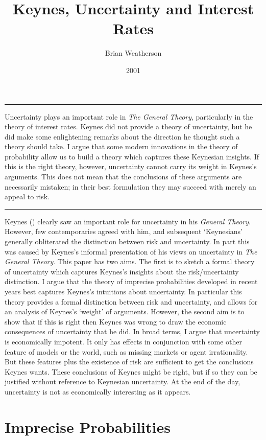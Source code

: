 \documentclass[
  10pt,
  letterpaper,
  DIV=11,
  numbers=noendperiod,
  twoside]{scrartcl}
\title{Keynes, Uncertainty and Interest Rates}
\author{Brian Weatherson}
\date{2001}
\renewenvironment{abstract}
 {\vspace{-1.25cm}
 \quotation\small\noindent\rule{\linewidth}{.5pt}\par\smallskip
 \noindent }
 {\par\noindent\rule{\linewidth}{.5pt}\endquotation}
\begin{document}
\maketitle
\begin{abstract}
Uncertainty plays an important role in \emph{The General Theory},
particularly in the theory of interest rates. Keynes did not provide a
theory of uncertainty, but he did make some enlightening remarks about
the direction he thought such a theory should take. I argue that some
modern innovations in the theory of probability allow us to build a
theory which captures these Keynesian insights. If this is the right
theory, however, uncertainty cannot carry its weight in Keynes's
arguments. This does not mean that the conclusions of these arguments
are necessarily mistaken; in their best formulation they may succeed
with merely an appeal to risk.
\end{abstract}


Keynes () clearly saw an important role
for uncertainty in his \emph{General Theory}. However, few
contemporaries agreed with him, and subsequent `Keynesians' generally
obliterated the distinction between risk and uncertainty. In part this
was caused by Keynes's informal presentation of his views on uncertainty
in \emph{The General Theory}. This paper has two aims. The first is to
sketch a formal theory of uncertainty which captures Keynes's insights
about the risk/uncertainty distinction. I argue that the theory of
imprecise probabilities developed in recent years best captures Keynes's
intuitions about uncertainty. In particular this theory provides a
formal distinction between risk and uncertainty, and allows for an
analysis of Keynes's `weight' of arguments. However, the second aim is
to show that if this is right then Keynes was wrong to draw the economic
consequences of uncertainty that he did. In broad terms, I argue that
uncertainty is economically impotent. It only has effects in conjunction
with some other feature of models or the world, such as missing markets
or agent irrationality. But these features plus the existence of risk
are sufficient to get the conclusions Keynes wants. These conclusions of
Keynes might be right, but if so they can be justified without reference
to Keynesian uncertainty. At the end of the day, uncertainty is not as
economically interesting as it appears.

\section{Imprecise Probabilities}\label{imprecise-probabilities}
\end{document}
